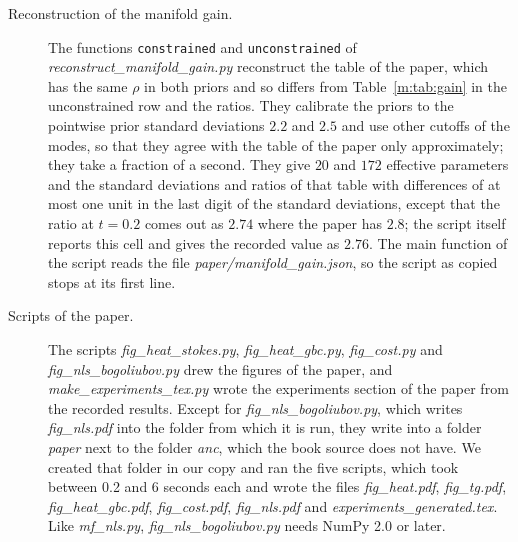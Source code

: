 \begin{description}
\item[Reconstruction of the manifold gain.] The functions \texttt{constrained} and \texttt{unconstrained} of \textit{reconstruct\_manifold\_gain.py} reconstruct the table of the paper, which has the same $\rho$ in both priors and so differs from Table~\ref{m:tab:gain} in the unconstrained row and the ratios. They calibrate the priors to the pointwise prior standard deviations $2.2$ and $2.5$ and use other cutoffs of the modes, so that they agree with the table of the paper only approximately; they take a fraction of a second. They give $20$ and $172$ effective parameters and the standard deviations and ratios of that table with differences of at most one unit in the last digit of the standard deviations, except that the ratio at $t=0.2$ comes out as $2.74$ where the paper has $2.8$; the script itself reports this cell and gives the recorded value as $2.76$. The main function of the script reads the file \textit{paper/manifold\_gain.json}, so the script as copied stops at its first line.
\item[Scripts of the paper.] The scripts \textit{fig\_heat\_stokes.py}, \textit{fig\_heat\_gbc.py}, \textit{fig\_cost.py} and \textit{fig\_nls\_bogoliubov.py} drew the figures of the paper, and \textit{make\_experiments\_tex.py} wrote the experiments section of the paper from the recorded results. Except for \textit{fig\_nls\_bogoliubov.py}, which writes \textit{fig\_nls.pdf} into the folder from which it is run, they write into a folder \textit{paper} next to the folder \textit{anc}, which the book source does not have. We created that folder in our copy and ran the five scripts, which took between 0.2 and 6 seconds each and wrote the files \textit{fig\_heat.pdf}, \textit{fig\_tg.pdf}, \textit{fig\_heat\_gbc.pdf}, \textit{fig\_cost.pdf}, \textit{fig\_nls.pdf} and \textit{experiments\_generated.tex}. Like \textit{mf\_nls.py}, \textit{fig\_nls\_bogoliubov.py} needs NumPy 2.0 or later.

\end{description}
